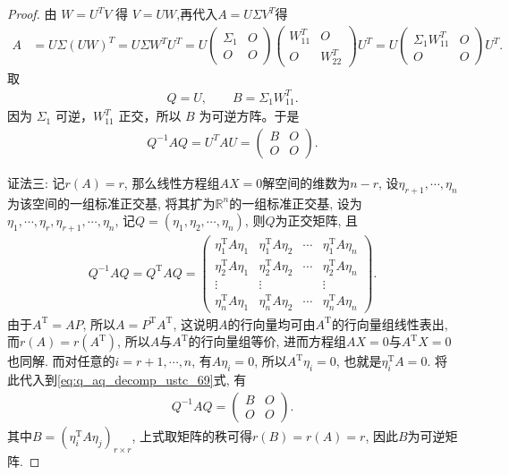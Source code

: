 \documentclass[../../main.tex]{subfiles}%
\begin{document}
\begin{proof}
由 $W=U^TV$ 得 $V=UW$,再代入$A=U\Sigma V^T$得
\begin{align*}
A&=U\Sigma (UW)^T=U\Sigma W^T U^T
=U\begin{pmatrix}
\Sigma_1&O\\
O&O
\end{pmatrix}
\begin{pmatrix}
W_{11}^T&O\\
O&W_{22}^T
\end{pmatrix}U^T
=U\begin{pmatrix}
\Sigma_1W_{11}^T&O\\
O&O
\end{pmatrix}U^T.
\end{align*}
取
\begin{align*}
Q=U,\qquad B=\Sigma_1W_{11}^T.
\end{align*}
因为 $\Sigma_1$ 可逆，$W_{11}^T$ 正交，所以 $B$ 为可逆方阵。于是
\begin{align*}
Q^{-1}AQ=U^TAU=
\begin{pmatrix}
B&O\\
O&O
\end{pmatrix}.
\end{align*}

{\color{blue}证法三:}
记$r(A) = r$, 那么线性方程组$AX = 0$解空间的维数为$n-r$, 设$\eta_{r+1},\cdots,\eta_n$为该空间的一组标准正交基, 将其扩为$\mathbb{R}^n$的一组标准正交基, 设为$\eta_1,\cdots,\eta_r,\eta_{r+1},\cdots,\eta_n$, 记$Q = (\eta_1,\eta_2,\cdots,\eta_n)$, 则$Q$为正交矩阵, 且
\begin{align}
Q^{-1}AQ = Q^{\mathrm{T}}AQ =
\begin{pmatrix}
\eta_1^{\mathrm{T}}A\eta_1 & \eta_1^{\mathrm{T}}A\eta_2 & \cdots & \eta_1^{\mathrm{T}}A\eta_n \\
\eta_2^{\mathrm{T}}A\eta_1 & \eta_2^{\mathrm{T}}A\eta_2 & \cdots & \eta_2^{\mathrm{T}}A\eta_n \\
\vdots & \vdots & & \vdots \\
\eta_n^{\mathrm{T}}A\eta_1 & \eta_n^{\mathrm{T}}A\eta_2 & \cdots & \eta_n^{\mathrm{T}}A\eta_n
\end{pmatrix}.
\label{eq:q_aq_decomp_ustc_69}
\end{align}
由于$A^{\mathrm{T}} = AP$, 所以$A = P^{\mathrm{T}}A^{\mathrm{T}}$, 这说明$A$的行向量均可由$A^{\mathrm{T}}$的行向量组线性表出, 而$r(A) = r(A^{\mathrm{T}})$, 所以$A$与$A^{\mathrm{T}}$的行向量组等价, 进而方程组$AX = 0$与$A^{\mathrm{T}}X = 0$也同解. 而对任意的$i = r+1,\cdots,n$, 有$A\eta_i = 0$, 所以$A^{\mathrm{T}}\eta_i = 0$, 也就是$\eta_i^{\mathrm{T}}A = 0$. 将此代入到\eqref{eq:q_aq_decomp_ustc_69}式, 有
\begin{align*}
Q^{-1}AQ = \begin{pmatrix} B & O \\ O & O \end{pmatrix}.
\end{align*}
其中$B = (\eta_i^{\mathrm{T}}A\eta_j)_{r\times r}$, 上式取矩阵的秩可得$r(B) = r(A) = r$, 因此$B$为可逆矩阵.
\end{proof}
\end{document}
